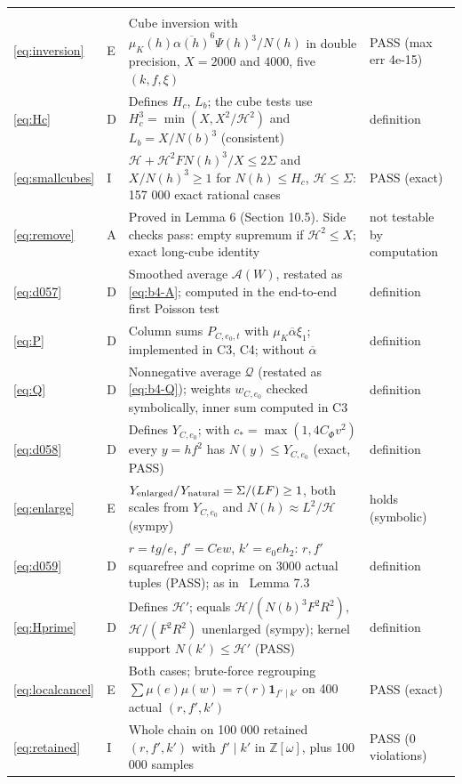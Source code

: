 \documentclass[11pt]{article}
\numberwithin{equation}{section}
\begin{document}
\begin{longtable}{@{}>{\raggedright\arraybackslash}p{1.2cm}>{\centering\arraybackslash}p{0.7cm}>{\raggedright\arraybackslash}p{9.05cm}>{\raggedright\arraybackslash}p{4.3cm}@{}}
\multicolumn{4}{@{}l}{\emph{Section~10}}\\
\eqref{eq:inversion} & E & Cube inversion with $\mu_K(h)\overline{\alpha(h)}^6\Psi(h)^3/N(h)$ in double precision, $X=2000$ and $4000$, five $(k,f,\xi)$ & PASS (max err 4e-15)\\
\eqref{eq:Hc} & D & Defines $H_c$, $L_b$; the cube tests use $H_c^3=\min(X,X^2/\mathcal H^2)$ and $L_b=X/N(b)^3$ (consistent) & definition\\
\eqref{eq:smallcubes} & I & $\mathcal H+\mathcal H^2FN(h)^3/X\le2\Sigma$ and $X/N(h)^3\ge1$ for $N(h)\le H_c$, $\mathcal H\le\Sigma$: 157 000 exact rational cases & PASS (exact)\\
\eqref{eq:remove} & A & Proved in Lemma 6 (Section 10.5). Side checks pass: empty supremum if $\mathcal H^2\le X$; exact long-cube identity & not testable by computation\\
\eqref{eq:d057} & D & Smoothed average $\mathcal A(W)$, restated as \eqref{eq:b4-A}; computed in the end-to-end first Poisson test & definition\\
\eqref{eq:P} & D & Column sums $P_{C,e_0,t}$ with $\mu_K\overline{\alpha}\xi_1$; implemented in C3, C4; \cite[(7.1)]{OAI1112} without $\overline{\alpha}$ & definition\\
\eqref{eq:Q} & D & Nonnegative average $\mathcal Q$ (restated as \eqref{eq:b4-Q}); weights $w_{C,e_0}$ checked symbolically, inner sum computed in C3 & definition\\
\eqref{eq:d058} & D & Defines $Y_{C,e_0}$; with $c_*=\max(1,4C_\Phi v^2)$ every $y=hf^2$ has $N(y)\le Y_{C,e_0}$ (exact, PASS) & definition\\
\eqref{eq:enlarge} & E & $Y_{\rm enlarged}/Y_{\rm natural}=\Sigma/(LF)\ge1$, both scales from $Y_{C,e_0}$ and $N(h)\approx L^2/\mathcal H$ (sympy) & holds (symbolic)\\
\eqref{eq:d059} & D & $r=tg/e$, $f'=Cew$, $k'=e_0eh_2$: $r,f'$ squarefree and coprime on 3000 actual tuples (PASS); as in~\cite{OAI1112} Lemma 7.3 & definition\\
\eqref{eq:Hprime} & D & Defines $\mathcal H'$; equals $\mathcal H/(N(b)^3F^2R^2)$, $\mathcal H/(F^2R^2)$ unenlarged (sympy); kernel support $N(k')\le\mathcal H'$ (PASS) & definition\\
\eqref{eq:localcancel} & E & Both cases; brute-force regrouping $\sum\mu(e)\mu(w)=\tau(r)\mathbf 1_{f'\mid k'}$ on 400 actual $(r,f',k')$ & PASS (exact)\\
\eqref{eq:retained} & I & Whole chain on 100 000 retained $(r,f',k')$ with $f'\mid k'$ in $\mathbb Z[\omega]$, plus 100 000 samples & PASS (0 violations)\\

\end{longtable}
\end{document}
